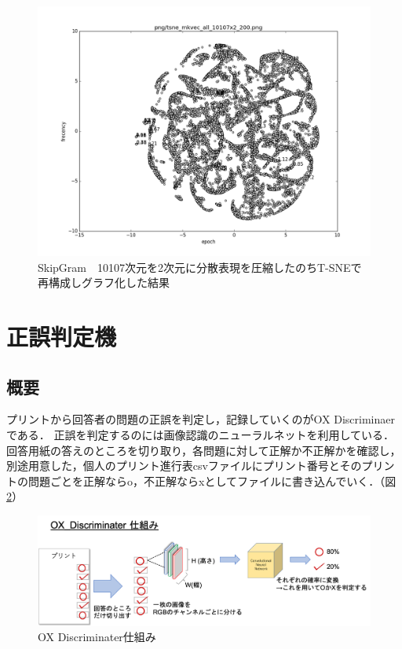 \documentclass[a4j,11pt,report]{jsbook}
\begin{document}
\begin{center}
  \begin{figure}[H]
    \centering
    \includegraphics[width=\linewidth]{image/tsne_mkvec_all_10107x2_200.png}
    \caption{SkipGram　10107次元を2次元に分散表現を圧縮したのちT-SNEで再構成しグラフ化した結果}
    \label{fig:10107x2cbow_tsne}
  \end{figure}
\end{center}

\clearpage
\section{正誤判定機}
\subsection{概要}
プリントから回答者の問題の正誤を判定し，記録していくのがOX Discriminaerである．
正誤を判定するのには画像認識のニューラルネットを利用している．回答用紙の答えのところを切り取り，各問題に対して正解か不正解かを確認し，別途用意した，個人のプリント進行表csvファイルにプリント番号とそのプリントの問題ごとを正解ならo，不正解ならxとしてファイルに書き込んでいく．（図\ref{fig:Discriminater_simple}）

\begin{center}
  \begin{figure}[H]
    \centering
    \includegraphics[width=\linewidth]{image/OX_Discriminater.png}
    \caption{OX Discriminater仕組み}
    \label{fig:Discriminater_simple}
  \end{figure}
\end{center}
\end{document}
